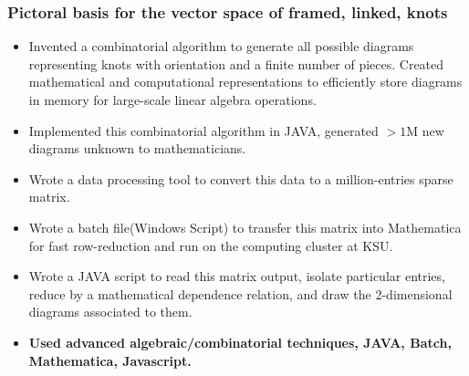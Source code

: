 \documentclass[a4paper,10pt,notitlepage]{article}
\begin{document}
\subsubsection*{Pictoral basis for the vector space of framed, linked, knots}
	\begin{itemize}
	\vspace{-5pt}\item 	Invented a combinatorial algorithm to generate all possible diagrams representing knots with orientation and a finite number of pieces. Created mathematical and computational representations to efficiently store diagrams in memory for large-scale linear algebra operations.
	\vspace{-5pt}\item 	Implemented this combinatorial algorithm in JAVA, generated $>1$M new diagrams unknown to mathematicians. 
	\vspace{-5pt}\item 	Wrote a data processing tool to convert this data to a million-entries sparse matrix.
	\vspace{-5pt}\item 	Wrote a batch file(Windows Script) to transfer this matrix into Mathematica for fast row-reduction and run on the computing cluster at KSU.
	\vspace{-5pt}\item  	Wrote a JAVA script to read this matrix output, isolate particular entries, reduce by a mathematical dependence relation, and draw the 2-dimensional diagrams associated to them.
	 \vspace{-5pt}\item 	\textbf{Used advanced algebraic/combinatorial techniques, JAVA, Batch, Mathematica, Javascript.}
	\end{itemize}
	

\end{document}
